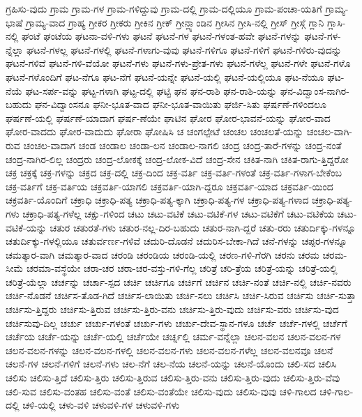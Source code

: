 {ಗ್ರಹಿಸು-ವುದು
ಗ್ರಾಮ
ಗ್ರಾಮ-ಗಳ
ಗ್ರಾಮ-ಗಳಿದ್ದುವು
ಗ್ರಾಮ-ದಲ್ಲಿ
ಗ್ರಾಮ-ದಲ್ಲಿಯೂ
ಗ್ರಾಮ-ಪಂಚಾ-ಯತಿಗೆ
ಗ್ರಾಮ್ಯ-ಭಾಷೆ
ಗ್ರಾಮ್ಯ-ವಾದ
ಗ್ರಾಹ್ಯ
ಗ್ರೀಕರ
ಗ್ರೀಕರು
ಗ್ರೀಕಿನ
ಗ್ರೀಕ್
ಗ್ರೀನ್ಲ್ಯಾಂಡಿನ
ಗ್ರೀಸಿನ
ಗ್ರೀಸಿ-ನಲ್ಲಿ
ಗ್ರೀಸ್
ಗ್ರೀಸ್ಗೆ
ಗ್ಲಾನಿ
ಗ್ಲಾಸಿ-ನಲ್ಲಿ
ಘಂಟೆ
ಘಂಟೆಯ
ಘಟನಾ-ವಳಿ-ಗಳು
ಘಟನೆ
ಘಟನೆ-ಗಳ
ಘಟನೆ-ಗಳಂತ-ಹವೇ
ಘಟನೆ-ಗಳನ್ನು
ಘಟನೆ-ಗಳ-ನ್ನೆಲ್ಲಾ
ಘಟನೆ-ಗಳಲ್ಲ
ಘಟನೆ-ಗಳಲ್ಲಿ
ಘಟನೆ-ಗಳಾಗು-ವುವು
ಘಟನೆ-ಗಳಿಗೂ
ಘಟನೆ-ಗಳಿಗೆ
ಘಟನೆ-ಗಳಿರು-ವುದನ್ನು
ಘಟನೆ-ಗಳಿವೆ
ಘಟನೆ-ಗಳಿ-ವೆಯೋ
ಘಟನೆ-ಗಳು
ಘಟನೆ-ಗಳು-ಪ್ರೇತ-ಗಳು
ಘಟನೆ-ಗಳೆಲ್ಲ
ಘಟನೆ-ಗಳೇ
ಘಟನೆ-ಗಳೊ
ಘಟನೆ-ಗಳೊಂದಿಗೆ
ಘಟ-ನೆಗೂ
ಘಟ-ನೆಗೆ
ಘಟನೆ-ಯನ್ನೇ
ಘಟನೆ-ಯಲ್ಲಿ
ಘಟನೆ-ಯಲ್ಲಿಯೂ
ಘಟ-ನೆಯೂ
ಘಟ-ನೆಯೆ
ಘಟ-ಸರ್ಪ-ವನ್ನು
ಘಟ್ಟ-ಗಳಾಗಿ
ಘಟ್ಟ-ದಲ್ಲಿ
ಘಟ್ಟಿ
ಘನ
ಘನ-ರಾಶಿ
ಘನ-ರಾಶಿ-ಯನ್ನು
ಘನ-ವಿದ್ವಾಂಸ-ನಾಗಿರ-ಬಹುದು
ಘನ-ವಿದ್ವಾಂಸನೂ
ಘನೀ-ಭೂತ-ವಾದ
ಘನೀ-ಭೂತ-ವಾಯಿತು
ಘರ್ಜಿ-ಸಿತು
ಘರ್ಷಣೆ-ಗಳಿಂದಲೂ
ಘರ್ಷಣೆ-ಯಲ್ಲಿ
ಘರ್ಷಣೆ-ಯಾದಾಗ
ಘರ್ಷ-ಣೆಯೇ
ಘಾಟಿನ
ಘೋರ
ಘೋರ-ಭಾವನೆ-ಯನ್ನು
ಘೋರ-ವಾದ
ಘೋರ-ವಾದದು
ಘೋರ-ವಾದುದು
ಘೋರಾ
ಘೋಷಿಸಿ
ಚ
ಚಂಗಲ್ಪೇಟೆ
ಚಂಚಲ
ಚಂಚಲತೆ-ಯನ್ನು
ಚಂಚಲ-ವಾಗಿ-ರುವ
ಚಂಚಲ-ವಾದಾಗ
ಚಂಡ
ಚಂಡಾಲ
ಚಂಡಾ-ಲನ
ಚಂಡಾಲ-ನಾಗಲಿ
ಚಂದ್ರ
ಚಂದ್ರ-ತಾರೆ-ಗಳನ್ನು
ಚಂದ್ರ-ನಂತೆ
ಚಂದ್ರ-ನಾಗಿರ-ಲಿಲ್ಲ
ಚಂದ್ರರು
ಚಂದ್ರ-ಲೋಕಕ್ಕೆ
ಚಂದ್ರ-ಲೋಕ-ವಿದೆ
ಚಂದ್ರ-ಸೇನ
ಚಕಿತ-ನಾಗಿ
ಚಕಿತ-ರಾಗು-ತ್ತಿದ್ದರೋ
ಚಕ್ರ
ಚಕ್ರಕ್ಕೆ
ಚಕ್ರ-ಗಳನ್ನು
ಚಕ್ರದ
ಚಕ್ರ-ದಲ್ಲಿ
ಚಕ್ರ-ದಿಂದ
ಚಕ್ರ-ವರ್ತಿ
ಚಕ್ರ-ವರ್ತಿ-ಗಳಂತೆ
ಚಕ್ರ-ವರ್ತಿ-ಗಳಾಗ-ಬೇಕೆಂಬ
ಚಕ್ರ-ವರ್ತಿಗೆ
ಚಕ್ರ-ವರ್ತಿಯ
ಚಕ್ರವರ್ತಿ-ಯಾಗಲಿ
ಚಕ್ರವರ್ತಿ-ಯಾಗಿ-ದ್ದರೂ
ಚಕ್ರವರ್ತಿ-ಯಾದ
ಚಕ್ರವರ್ತಿ-ಯಿಂದ
ಚಕ್ರವರ್ತಿ-ಯೊಂದಿಗೆ
ಚಕ್ರಾಧಿ
ಚಕ್ರಾಧಿ-ಪತ್ಯ
ಚಕ್ರಾಧಿ-ಪತ್ಯ-ಕ್ಕಾಗಿ
ಚಕ್ರಾಧಿ-ಪತ್ಯ-ಗಳ
ಚಕ್ರಾಧಿ-ಪತ್ಯ-ಗಳಾದ
ಚಕ್ರಾಧಿ-ಪತ್ಯ-ಗಳು
ಚಕ್ರಾಧಿ-ಪತ್ಯ-ಗಳೆಲ್ಲ
ಚಕ್ಷು-ಗಳಿಂದ
ಚಟು
ಚಟು-ವಟಿಕೆ
ಚಟು-ವಟಿಕೆ-ಗಳ
ಚಟು-ವಟಿಕೆಗೆ
ಚಟು-ವಟಿಕೆಯ
ಚಟು-ವಟಿಕೆ-ಯನ್ನು
ಚತುರ
ಚತುರತೆ-ಗಳು
ಚತುರ-ನಲ್ಲ-ದಿರ-ಬಹುದು
ಚತುರ-ನಾಗಿ-ದ್ದರೆ
ಚತು-ರರು
ಚತುರ್ದಿಕ್ಕು-ಗಳನ್ನೂ
ಚತುರ್ದಿಕ್ಕು-ಗಳಲ್ಲಿಯೂ
ಚತುರ್ವರ್ಣ-ಗಳಿವೆ
ಚದುರಿ-ದೊಡನೆ
ಚದುರಿಸ-ಬೇಕಾ-ಗಿದೆ
ಚನೆ-ಗಳನ್ನು
ಚಪ್ಪರ-ಗಳನ್ನೂ
ಚಮತ್ಕಾರ-ವಾಗಿ
ಚಮತ್ಕಾರ-ವಾದ
ಚರಂಡಿ
ಚರಂಡಿಯ
ಚರಂಡಿ-ಯಲ್ಲಿ
ಚರಣ-ಗಳಿ-ಗೆರಗಿ
ಚರನು
ಚರಮ
ಚರಮ-ಸೀಮೆ
ಚರಮಾ-ವಸ್ಥೆಯೇ
ಚರಾ-ಚರ
ಚರಾ-ಚರ-ವಸ್ತು-ಗಳಿ-ಗೆಲ್ಲ
ಚರಿತ್ರೆ
ಚರಿ-ತ್ರೆಯ
ಚರಿತ್ರೆ-ಯನ್ನು
ಚರಿತ್ರೆ-ಯಲ್ಲಿ
ಚರಿತ್ರೆ-ಯೆಲ್ಲಾ
ಚರ್ಚನ್ನು
ಚರ್ಚಾ-ಸ್ಪದ
ಚರ್ಚಿ
ಚರ್ಚಿಗೂ
ಚರ್ಚಿಗೆ
ಚರ್ಚಿನ
ಚರ್ಚಿ-ನಂತೆ
ಚರ್ಚಿ-ನಲ್ಲಿ
ಚರ್ಚಿ-ನವರು
ಚರ್ಚಿ-ನೊಡನೆ
ಚರ್ಚಿಸ-ತೊಡ-ಗಿದೆ
ಚರ್ಚಿಸ-ಲಾಯಿತು
ಚರ್ಚಿ-ಸಲು
ಚರ್ಚಿಸಿ
ಚರ್ಚಿ-ಸಿರುವ
ಚರ್ಚಿಸು
ಚರ್ಚಿ-ಸುತ್ತಾ
ಚರ್ಚಿಸು-ತ್ತಿದ್ದರು
ಚರ್ಚಿಸು-ತ್ತಿರುವ
ಚರ್ಚಿಸು-ತ್ತಿರು-ವನು
ಚರ್ಚಿಸು-ತ್ತಿರು-ವುದು
ಚರ್ಚಿಸು-ವರು
ಚರ್ಚಿಸು-ವುದ
ಚರ್ಚಿಸುವು-ದಿಲ್ಲ
ಚರ್ಚು
ಚರ್ಚು-ಗಳಂತೆ
ಚರ್ಚು-ಗಳು
ಚರ್ಚು-ದೇವ-ಸ್ಥಾನ-ಗಳೂ
ಚರ್ಚೆ
ಚರ್ಚೆ-ಗಳಲ್ಲಿ
ಚರ್ಚೆಗೆ
ಚರ್ಚೆಯ
ಚರ್ಚೆ-ಯನ್ನು
ಚರ್ಚೆ-ಯಲ್ಲಿ
ಚರ್ಚೆಯೇ
ಚರ್ಚ್ನಲ್ಲಿ
ಚರ್ಮ-ವನ್ನೆಲ್ಲಾ
ಚಲನ-ವಲನ
ಚಲನ-ವಲನ-ಗಳ
ಚಲನ-ವಲನ-ಗಳನ್ನು
ಚಲನ-ವಲನ-ಗಳಲ್ಲಿ
ಚಲನ-ವಲನ-ಗಳು
ಚಲನ-ವಲನ-ಗಳೆಲ್ಲ
ಚಲನ-ವಲನವೂ
ಚಲನೆ
ಚಲನೆ-ಗಳ
ಚಲನೆ-ಗಳಿಗೆ
ಚಲನೆ-ಗಳು
ಚಲ-ನೆಗೆ
ಚಲ-ನೆಯ
ಚಲನೆ-ಯನ್ನು
ಚಲನೆ-ಯೊಂದು
ಚಲಿ-ಸದ
ಚಲಿಸಿ
ಚಲಿಸು
ಚಲಿಸು-ತ್ತಿದೆ
ಚಲಿಸು-ತ್ತಿರು
ಚಲಿಸು-ತ್ತಿರುವ
ಚಲಿಸು-ತ್ತಿರು-ವನು
ಚಲಿಸು-ತ್ತಿರು-ವುದು
ಚಲಿಸು-ತ್ತಿರು-ವೆವು
ಚಲಿ-ಸುವ
ಚಲಿಸು-ವಂತಹ
ಚಲಿಸು-ವಂತೆ
ಚಲಿಸು-ವಂತೆಯೇ
ಚಲಿಸು-ವುದು
ಚಲಿಸು-ವುವು
ಚಳಿ-ಗಾಲದ
ಚಳಿ-ಗಾಲ-ದಲ್ಲಿ
ಚಳಿ-ಯಲ್ಲಿ
ಚಳು-ವಳಿ
ಚಳುವಳಿ-ಗಳ
ಚಳುವಳಿ-ಗಳು
}
